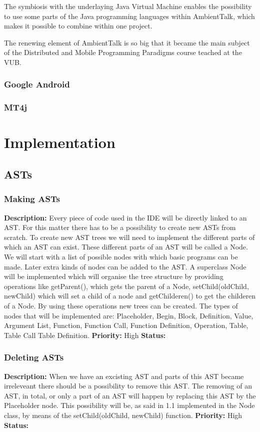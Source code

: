 \documentclass[a4paper,12pt]{report}
\begin{document}
The symbiosis with the underlaying Java Virtual Machine enables the possibility to use some parts of the Java programming languages within AmbientTalk, which makes it possible to combine within
one project.

The renewing element of AmbientTalk is so big that it became the main subject of the Distributed and Mobile Programming Paradigms course teached at the VUB.
\subsection{Google Android}
\subsection{MT4j}
\chapter{Implementation}
\section{ASTs}
\subsection{Making ASTs}
\textbf{Description: } Every piece of code used in the IDE will be directly linked to an AST. For this matter there has to be a possibility to create new ASTs from scratch.
To create new AST trees we will need to implement the different parts of which an AST can exist. These different parts of an AST will be called a Node. We will start with
a list of possible nodes with which basic programs can be made. Later extra kinds of nodes can be added to the AST.
A superclass Node will be implemented which will organise the tree structure by providing operations like getParent(), which gets the parent of a Node, setChild(oldChild, newChild)
which will set a child of a node and getChilderen() to get the childeren of a Node. By using these operations new trees can be created. 
The types of nodes that will be implemented are: Placeholder, Begin, Block, Definition, Value, Argument List, Function, Function Call, Function Definition, Operation, Table, Table Call
Table Definition.
 \newline
\textbf{Priority:} High \newline
\textbf{Status: } \newline
\subsection{Deleting ASTs}
\textbf{Description: }When we have an excisting AST and parts of this AST became irreleveant there should be a possibility to remove this AST. The removing of an AST, in total,
or only a part of an AST will happen by replacing this AST by the Placeholder node. This possibility will be, as said in 1.1 implemented in the Node class, by means of the 
setChild(oldChild, newChild) function. \newline
\textbf{Priority:} High \newline
\textbf{Status: } \newline
\end{document}
